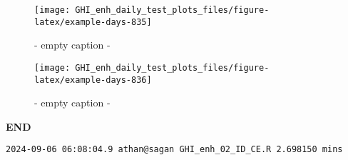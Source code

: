 \documentclass[
  10pt,
  a4paper,oneside]{article}
\begin{document}
\begin{figure}[H]

{\centering \texttt{[image: GHI\_enh\_daily\_test\_plots\_files/figure-latex/example-days-835]} 

}

\caption{ - empty caption - }\label{fig:example-days-835}
\end{figure}

\begin{figure}[H]

{\centering \texttt{[image: GHI\_enh\_daily\_test\_plots\_files/figure-latex/example-days-836]} 

}

\caption{ - empty caption - }\label{fig:example-days-836}
\end{figure}

\textbf{END}

\begin{verbatim}
2024-09-06 06:08:04.9 athan@sagan GHI_enh_02_ID_CE.R 2.698150 mins
\end{verbatim}
\end{document}
